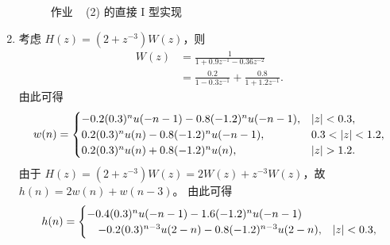 \begin{solution}
\begin{enumerate}[label=(\arabic*)]
\begin{figure}[H]
                \caption{作业 \thehomework~ (2) 的直接 I 型实现}
                \label{fig:chap4-part2-homework2}
            \end{figure}
        \item 考虑 $H(z) = (2 + z^{-3})W(z)$，则
            \begin{align*}
                W(z) & = \frac{1}{1 + 0.9z^{-1} - 0.36z^{-2}} \\
                & = \frac{0.2}{1 - 0.3z^{-1}} + \frac{0.8}{1 + 1.2z^{-1}}.
            \end{align*}
            由此可得
            \begin{align*}
                w(n) = \begin{cases}
                        -0.2(0.3)^nu(-n-1) - 0.8(-1.2)^nu(-n-1), & \left|z\right| < 0.3, \\
                        0.2(0.3)^nu(n) - 0.8(-1.2)^nu(-n-1), & 0.3 < \left|z\right| < 1.2, \\
                        0.2(0.3)^nu(n) + 0.8(-1.2)^nu(n), & \left|z\right| > 1.2.
                    \end{cases}
            \end{align*}
            由于 $H(z) = (2 + z^{-3})W(z) = 2W(z) + z^{-3}W(z)$，故 $h(n) = 2w(n) + w(n - 3)$。
            由此可得
            \begin{align*}
                h(n) = \begin{cases}
                    -0.4(0.3)^nu(-n-1) - 1.6(-1.2)^nu(-n-1) \\
                    \quad - 0.2(0.3)^{n - 3}u(2 - n) - 0.8(-1.2)^{n - 3}u(2 - n), & \left|z\right| < 0.3, \\

\end{cases}
\end{align*}
\end{enumerate}
\end{solution}

